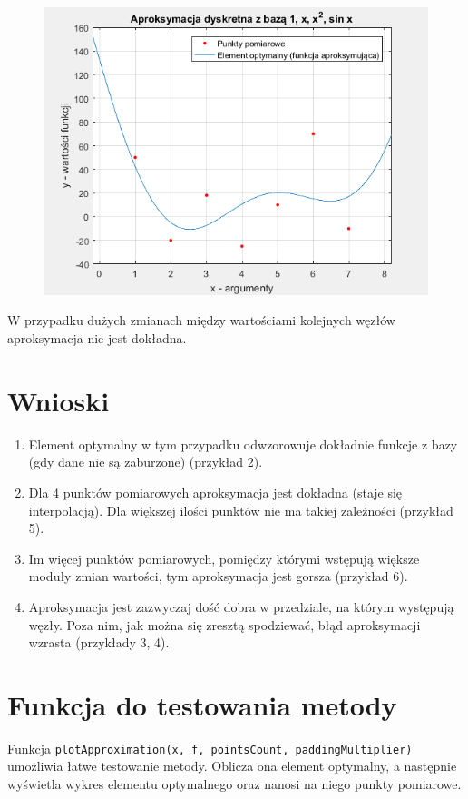 \documentclass[12pt]{article}
\begin{document}
\begin{enumerate}[label=\textbf{Przykład \arabic*}]
		\begin{figure}[H]
			\centering
			\includegraphics[scale=0.8]{images/example-6.png}
		\end{figure}
		
		W przypadku dużych zmianach między wartościami kolejnych węzłów aproksymacja nie jest dokładna.
		
	\end{enumerate}
	
	
	
	
	\section{Wnioski}
	\begin{enumerate}
		\item Element optymalny w tym przypadku odwzorowuje dokładnie funkcje z bazy (gdy dane nie są zaburzone) (przykład 2).
		\item Dla 4 punktów pomiarowych aproksymacja jest dokładna (staje się interpolacją). Dla większej ilości punktów nie ma takiej zależności (przykład 5).
		\item Im więcej punktów pomiarowych, pomiędzy którymi wstępują większe moduły zmian wartości, tym aproksymacja jest gorsza (przykład 6).
		\item Aproksymacja jest zazwyczaj dość dobra w przedziale, na którym występują węzły. Poza nim, jak można się zresztą spodziewać, błąd aproksymacji wzrasta (przykłady 3, 4).
	\end{enumerate}
	
	
	
	\section{Funkcja do testowania metody}
	Funkcja \texttt{plotApproximation(x, f, pointsCount, paddingMultiplier)} umożliwia łatwe testowanie metody. Oblicza ona element optymalny, a następnie wyświetla wykres elementu optymalnego oraz nanosi na niego punkty pomiarowe.
	
\end{document}
